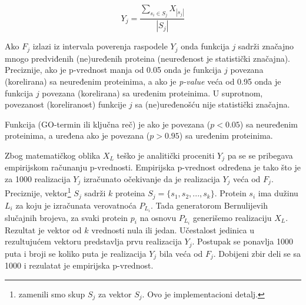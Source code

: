 
$$ Y_j = \dfrac {\sum_{s_i \in S_j} {X_{|s_j|}}}{|S_j|}$$

Ako $F_j$ izlazi iz intervala poverenja raspodele $Y_j$ onda funkcija $j$
sadrži značajno mnogo predviđenih (ne)uređenih proteina (neuređenost je
statistički značajna).
Preciznije, ako je p-vrednost  manja od 0.05 onda je funkcija $j$
povezana (korelirana) sa neuređenim proteinima, a ako je \textit{p-value} veća
od 0.95 onda je funkcija $j$ povezana (korelirana) sa uređenim proteinima. U
suprotnom, povezanost (koreliranost) funkcije $j$ sa (ne)uređenošću nije
statistički značajna.  

\begin{definicija}
  \label{neuredjena_funkcija}
  Funkcija (GO-termin ili ključna reč) je  ako je povezana
  ($p<0.05$) sa neuređenim proteinima, a uređena ako je povezana ($p>0.95$) sa
  uređenim proteinima.
\end{definicija}


Zbog matematičkog oblika $X_L$ teško je analitički proceniti $Y_j$ pa se se
pribegava empirijskom računanju p-vrednosti. Empirijska p-vrednost određena je
tako što je za 1000 realizacija $Y_j$ izračunato očekivanje da je realizacija
$Y_j$ veća od $F_j$.
Preciznije, vektor\footnote{zamenili smo skup $S_j$ za vektor $S_j$. Ovo je
implementacioni detalj.} $S_j$ sadrži $k$ proteina $S_j=\{s_1, s_2, ...
,s_{k}\}$.  Protein $s_i$ ima dužinu $L_i$ za koju je izračunata verovatnoća
$P_{L_i}$.  Tada generatorom Bernulijevih slučajnih brojeva, za svaki protein
$p_i$ na osnovu $P_{L_i}$ generišemo realizaciju $X_L$. Rezultat je vektor od
$k$ vrednosti nula ili jedan. Učestalost jedinica u rezultujućem vektoru
predstavlja prvu realizacija $Y_j$.  Postupak se ponavlja 1000 puta i broji
se koliko puta je realizacija $Y_j$ bila veća od $F_j$. Dobijeni zbir deli se
sa 1000 i rezulatat je empirijska p-vrednost.


